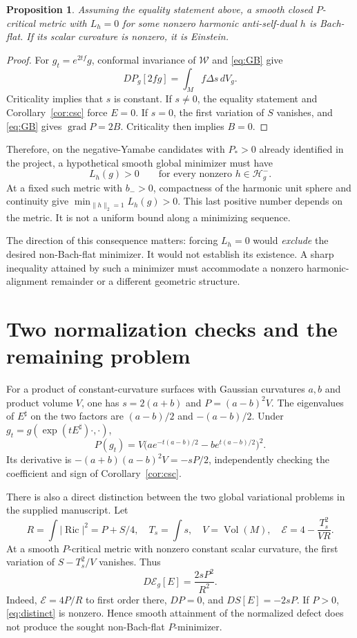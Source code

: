 \documentclass[11pt]{article}
\newcommand{\Ric}{\operatorname{Ric}}
\newcommand{\grad}{\operatorname{grad}}
\newcommand{\dd}{\,dV_g}
\newtheorem{proposition}[theorem]{Proposition}
\theoremstyle{remark}
\begin{document}
\begin{proposition}\label{prop:flux}
Assuming the equality statement above, a smooth closed $P$-critical metric
with $L_h=0$ for some nonzero harmonic anti-self-dual $h$ is Bach-flat.
If its scalar curvature is nonzero, it is Einstein.
\end{proposition}
\begin{proof}
For $g_t=e^{2tf}g$, conformal invariance of $\mathcal W$ and
\eqref{eq:GB} give
\[
 DP_g[2fg]=\int_M f\Delta s\dd.
\]
Criticality implies that $s$ is constant. If $s\ne0$, the equality
statement and Corollary~\ref{cor:csc} force $E=0$. If $s=0$, the
first variation of $S$ vanishes, and \eqref{eq:GB} gives
$\grad P=2B$. Criticality then implies $B=0$.
\end{proof}

Therefore, on the negative-Yamabe candidates with $P_*>0$ already
identified in the project, a hypothetical smooth global minimizer must have
\begin{equation}
 L_h(g)>0\qquad\text{for every nonzero }h\in\mathcal H_g^-.
 \label{eq:positive-remainder}
\end{equation}
At a fixed such metric with $b_->0$, compactness of the harmonic unit
sphere and continuity give $\min_{\|h\|_2=1}L_h(g)>0$.
This last positive number depends on the metric. It is not a uniform
bound along a minimizing sequence.

The direction of this consequence matters: forcing $L_h=0$ would
\emph{exclude} the desired non-Bach-flat minimizer. It would not establish
its existence. A sharp inequality attained by such a minimizer must
accommodate a nonzero harmonic-alignment remainder or a different
geometric structure.

\section{Two normalization checks and the remaining problem}

For a product of constant-curvature surfaces with Gaussian curvatures
$a,b$ and product volume $V$, one has $s=2(a+b)$ and
$P=(a-b)^2V$. The eigenvalues of $E^\sharp$ on the two factors are
$(a-b)/2$ and $-(a-b)/2$. Under
$g_t=g(\exp(tE^\sharp)\cdot,\cdot)$,
\[
 P(g_t)=V\bigl(ae^{-t(a-b)/2}-be^{t(a-b)/2}\bigr)^2.
\]
Its derivative is $-(a+b)(a-b)^2V=-sP/2$, independently checking the
coefficient and sign of Corollary~\ref{cor:csc}.

There is also a direct distinction between the two global variational
problems in the supplied manuscript. Let
\[
 R=\int|\Ric|^2=P+S/4,\quad
 T_s=\int s,\quad V=\operatorname{Vol}(M),\quad
 \mathcal E=4-\frac{T_s^2}{VR}.
\]
At a smooth $P$-critical metric with nonzero constant scalar curvature,
the first variation of $S-T_s^2/V$ vanishes. Thus
\begin{equation}
 \boxed{D\mathcal E_g[E]=\frac{2sP^2}{R^2}.}
 \label{eq:distinct}
\end{equation}
Indeed, $\mathcal E=4P/R$ to first order there, $DP=0$, and
$DS[E]=-2sP$. If $P>0$, \eqref{eq:distinct} is nonzero. Hence smooth
attainment of the normalized defect does not produce the sought
non-Bach-flat $P$-minimizer.
\end{document}
